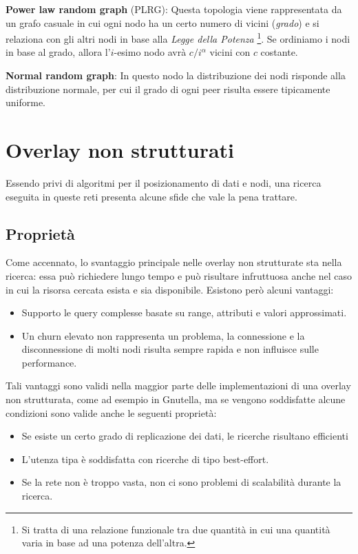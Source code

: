 \textbf{Power law random graph} (PLRG): Questa topologia viene rappresentata da un grafo casuale in cui ogni nodo ha un certo numero di vicini (\emph{grado}) e si relaziona con gli altri nodi in base alla
\emph{Legge della Potenza} \footnote{Si tratta di una relazione   funzionale tra due quantità in cui una quantità varia in base ad una   potenza dell'altra.}. Se ordiniamo i nodi in base al grado, allora l'$i$-esimo nodo avrà $c/i^\alpha$ vicini con $c$ costante.

\textbf{Normal random graph}: In questo nodo la distribuzione dei nodi risponde alla distribuzione normale, per cui il grado di ogni peer risulta essere tipicamente uniforme.

\section{Overlay non strutturati}\label{overlay-non-strutturati}

Essendo privi di algoritmi per il posizionamento di dati e nodi, una ricerca eseguita in queste reti presenta alcune sfide che vale la pena trattare.

\subsection{Proprietà}\label{proprietuxe0}

Come accennato, lo svantaggio principale nelle overlay non strutturate sta nella ricerca: essa può richiedere lungo tempo e può risultare infruttuosa anche nel caso in cui la risorsa cercata esista e sia disponibile. Esistono però alcuni vantaggi:

\begin{itemize}
\itemsep1pt\parskip0pt
\item
  Supporto le query complesse basate su range, attributi e valori   approssimati.
\item
  Un churn elevato non rappresenta un problema, la connessione e la   disconnessione di molti nodi risulta sempre rapida e non influisce   sulle performance.
\end{itemize}

Tali vantaggi sono validi nella maggior parte delle implementazioni di una overlay non strutturata, come ad esempio in Gnutella, ma se vengono soddisfatte alcune condizioni sono valide anche le seguenti proprietà: 
\begin{itemize}
\itemsep1pt\parskip0pt
\item
  Se esiste un certo grado di replicazione dei dati, le ricerche   risultano efficienti
\item
  L'utenza tipa è soddisfatta con ricerche di tipo best-effort.
\item
  Se la rete non è troppo vasta, non ci sono problemi di scalabilità   durante la ricerca.
\end{itemize}


